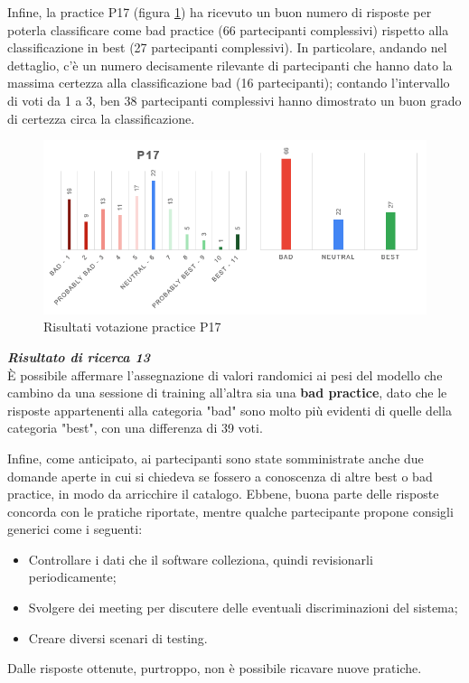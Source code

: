 Infine, la practice P17 (figura \ref{im-a-prac-18}) ha ricevuto un buon numero di risposte per poterla classificare come bad practice (66 partecipanti complessivi) rispetto alla classificazione in best (27 partecipanti complessivi). In particolare, andando nel dettaglio, c'è un numero decisamente rilevante di partecipanti che hanno dato la massima certezza alla classificazione bad (16 partecipanti); contando l'intervallo di voti da 1 a 3, ben 38 partecipanti complessivi hanno dimostrato un buon grado di certezza circa la classificazione.

\begin{figure}[h!]
    \centering
    \includegraphics[width=1\textwidth]{figure/data-analysis3/P17.png}
    \caption{Risultati votazione practice P17}
    \label{im-a-prac-18}
\end{figure}

\begin{center}
    \begin{tcolorbox}[width=400pt, colframe=black, colback=Gray!30]
		\begin{minipage}{\textwidth}
			\textit{\faKey \textbf{ Risultato di ricerca 13}}\\
			È possibile affermare l'assegnazione di valori randomici ai pesi del modello che cambino da una sessione di training all'altra sia una \textbf{bad practice}, dato che le risposte appartenenti alla categoria "bad" sono molto più evidenti di quelle della categoria "best", con una differenza di 39 voti.
		\end{minipage}
	\end{tcolorbox}
\end{center}

Infine, come anticipato, ai partecipanti sono state somministrate anche due domande aperte in cui si chiedeva se fossero a conoscenza di altre best o bad practice, in modo da arricchire il catalogo. Ebbene, buona parte delle risposte concorda con le pratiche riportate, mentre qualche partecipante propone consigli generici come i seguenti:
\begin{itemize}
    \item Controllare i dati che il software colleziona, quindi revisionarli periodicamente;
    \item Svolgere dei meeting per discutere delle eventuali discriminazioni del sistema;
    \item Creare diversi scenari di testing.
\end{itemize}
Dalle risposte ottenute, purtroppo, non è possibile ricavare nuove pratiche.

